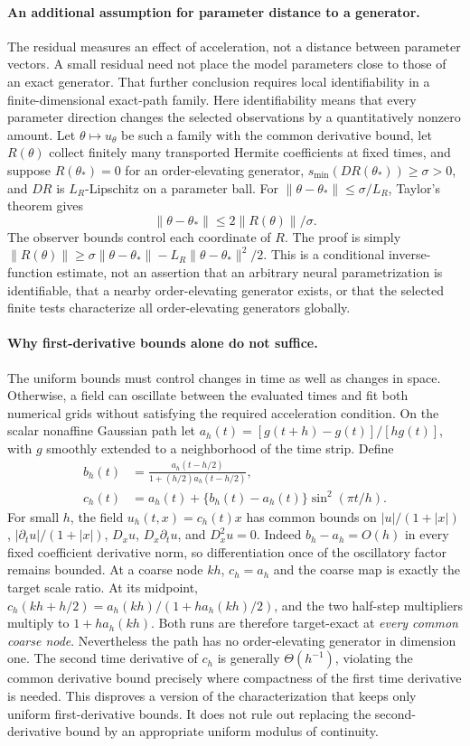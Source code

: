 \paragraph{An additional assumption for parameter distance to a generator.}
The residual measures an effect of acceleration, not a distance between
parameter vectors. A small residual need not place the model parameters
close to those of an exact generator. That further conclusion requires
local identifiability in a finite-dimensional exact-path family.
Here identifiability means that every parameter direction changes the
selected observations by a quantitatively nonzero amount. Let $\theta\mapsto
u_\theta$ be such a family with the common derivative bound, let $R(\theta)$ collect
finitely many transported Hermite coefficients at fixed times, and suppose
$R(\theta_*)=0$ for an order-elevating generator,
$s_{\min}(DR(\theta_*))\ge\sigma>0$, and $DR$ is $L_R$-Lipschitz on a
parameter ball. For $\|\theta-\theta_*\|\le\sigma/L_R$, Taylor's theorem gives
\[
 \|\theta-\theta_*\|\le 2\|R(\theta)\|/\sigma.
\]
The observer bounds control each coordinate of $R$. The proof is simply
$\|R(\theta)\|\ge\sigma\|\theta-\theta_*\|-L_R\|\theta-\theta_*\|^2/2$.
This is a conditional inverse-function estimate, not an assertion that an
arbitrary neural parametrization is identifiable, that a nearby order-elevating generator exists,
or that the selected finite tests characterize all order-elevating generators globally.

\paragraph{Why first-derivative bounds alone do not suffice.}
The uniform bounds must control changes in time as well as changes in space.
Otherwise, a field can oscillate between the evaluated times and fit both
numerical grids without satisfying the required acceleration condition.
On the scalar nonaffine Gaussian path let $a_h(t)=[g(t+h)-g(t)]/[hg(t)]$,
with $g$ smoothly extended to a neighborhood of the time strip. Define
\begin{align}
 b_h(t)&=\frac{a_h(t-h/2)}{1+(h/2)a_h(t-h/2)},\\
 c_h(t)&=a_h(t)+\{b_h(t)-a_h(t)\}\sin^2(\pi t/h).
 \label{eq:temporal-alias-field}
\end{align}
For small $h$, the field $u_h(t,x)=c_h(t)x$ has common bounds on
$|u|/(1+|x|)$, $|\partial_tu|/(1+|x|)$, $D_xu$,
$D_x\partial_tu$, and $D_x^2u=0$. Indeed $b_h-a_h=O(h)$ in every fixed
coefficient derivative norm, so differentiation once of the oscillatory
factor remains bounded. At a coarse node $kh$, $c_h=a_h$ and the coarse
map is exactly the target scale ratio. At its midpoint,
$c_h(kh+h/2)=a_h(kh)/(1+ha_h(kh)/2)$, and the two half-step multipliers
multiply to $1+ha_h(kh)$. Both runs are therefore target-exact at \emph{every
common coarse node}. Nevertheless the path has no order-elevating generator in
dimension one. The second time derivative of $c_h$ is generally
$\Theta(h^{-1})$, violating the common derivative bound precisely where compactness
of the first time derivative is needed. This disproves a version of the
characterization that keeps only uniform first-derivative bounds. It does
not rule out replacing the second-derivative bound by an appropriate
uniform modulus of continuity.
